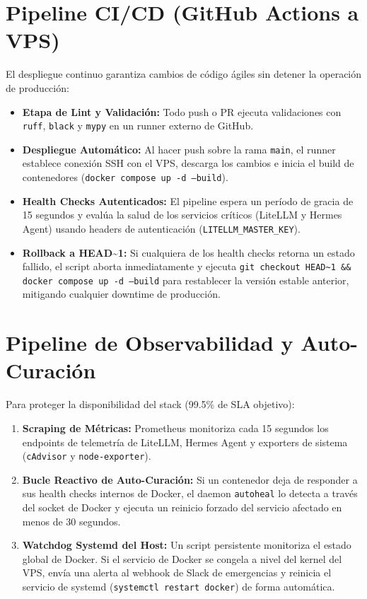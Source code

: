 \documentclass[12pt,a4paper,openany]{book}
\newcommand{\code}[1]{\texttt{\small#1}}
\begin{document}
\section{Pipeline CI/CD (GitHub Actions a VPS)}
El despliegue continuo garantiza cambios de código ágiles sin detener la operación de producción:
\begin{itemize}
    \item \textbf{Etapa de Lint y Validación:} Todo push o PR ejecuta validaciones con \code{ruff}, \code{black} y \code{mypy} en un runner externo de GitHub.
    \item \textbf{Despliegue Automático:} Al hacer push sobre la rama \code{main}, el runner establece conexión SSH con el VPS, descarga los cambios e inicia el build de contenedores (\code{docker compose up -d --build}).
    \item \textbf{Health Checks Autenticados:} El pipeline espera un período de gracia de 15 segundos y evalúa la salud de los servicios críticos (LiteLLM y Hermes Agent) usando headers de autenticación (\code{LITELLM\_MASTER\_KEY}).
    \item \textbf{Rollback a HEAD\~{}1:} Si cualquiera de los health checks retorna un estado fallido, el script aborta inmediatamente y ejecuta \code{git checkout HEAD\~{}1 \&\& docker compose up -d --build} para restablecer la versión estable anterior, mitigando cualquier downtime de producción.
\end{itemize}

\section{Pipeline de Observabilidad y Auto-Curación}
Para proteger la disponibilidad del stack (99.5\% de SLA objetivo):
\begin{enumerate}
    \item \textbf{Scraping de Métricas:} Prometheus monitoriza cada 15 segundos los endpoints de telemetría de LiteLLM, Hermes Agent y exporters de sistema (\code{cAdvisor} y \code{node-exporter}).
    \item \textbf{Bucle Reactivo de Auto-Curación:} Si un contenedor deja de responder a sus health checks internos de Docker, el daemon \code{autoheal} lo detecta a través del socket de Docker y ejecuta un reinicio forzado del servicio afectado en menos de 30 segundos.
    \item \textbf{Watchdog Systemd del Host:} Un script persistente monitoriza el estado global de Docker. Si el servicio de Docker se congela a nivel del kernel del VPS, envía una alerta al webhook de Slack de emergencias y reinicia el servicio de systemd (\code{systemctl restart docker}) de forma automática.
\end{enumerate}
\end{document}
